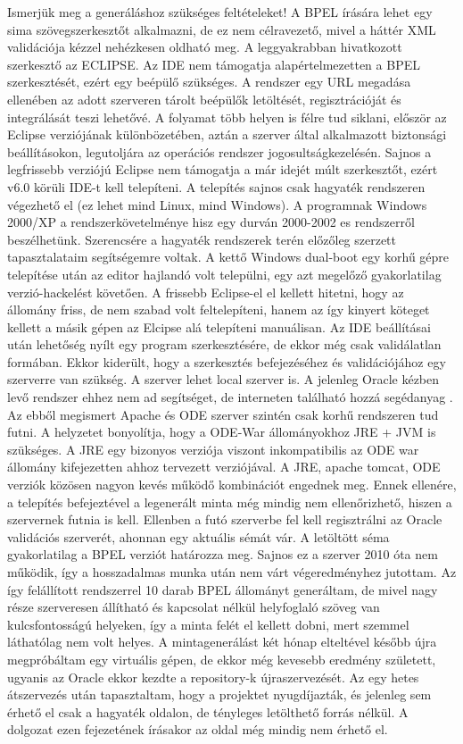 Ismerjük meg a generáláshoz szükséges feltételeket! A BPEL írására lehet egy sima szövegszerkesztőt alkalmazni, de ez nem célravezető, mivel a háttér XML validációja kézzel nehézkesen oldható meg. A leggyakrabban hivatkozott szerkesztő az ECLIPSE. Az IDE nem támogatja alapértelmezetten a BPEL szerkesztését, ezért egy beépülő szükséges. A rendszer egy URL megadása ellenében az adott szerveren tárolt beépülők letöltését, regisztrációját és integrálását teszi lehetővé. A folyamat több helyen is félre tud siklani, először az Eclipse verziójának különbözetében, aztán a szerver által alkalmazott biztonsági beállításokon, legutoljára az operációs rendszer jogosultságkezelésén. Sajnos a legfrissebb verziójú Eclipse nem támogatja a már idejét múlt szerkesztőt, ezért v6.0 körüli IDE-t kell telepíteni. A telepítés sajnos csak hagyaték rendszeren végezhető el (ez lehet mind Linux, mind Windows). A programnak Windows 2000/XP a rendszerkövetelménye hisz egy durván 2000-2002 es rendszerről beszélhetünk. Szerencsére a hagyaték rendszerek terén előzőleg szerzett tapasztalataim segítségemre voltak. A kettő Windows dual-boot egy korhű gépre telepítése után az editor hajlandó volt települni, egy azt megelőző gyakorlatilag verzió-hackelést követően. A frissebb Eclipse-el el kellett hitetni, hogy az állomány friss, de nem szabad volt feltelepíteni, hanem az így kinyert köteget kellett a másik gépen az Elcipse alá telepíteni manuálisan. Az IDE beállításai után lehetőség nyílt egy program szerkesztésére, de ekkor még csak validálatlan formában. Ekkor kiderült, hogy a szerkesztés befejezéséhez és validációjához egy szerverre van szükség. A szerver lehet local szerver is. A jelenleg Oracle kézben levő rendszer ehhez nem ad segítséget, de interneten található hozzá segédanyag \cite{helloworld}. Az ebből megismert Apache és ODE szerver szintén csak korhű rendszeren tud futni. A helyzetet bonyolítja, hogy a ODE-War állományokhoz JRE + JVM is szükséges. A JRE egy bizonyos verziója viszont inkompatibilis az ODE war állomány kifejezetten ahhoz tervezett verziójával. A JRE, apache tomcat, ODE verziók közösen nagyon kevés működő kombinációt engednek meg. Ennek ellenére, a telepítés befejeztével a legenerált minta még mindig nem ellenőrizhető, hiszen a szervernek futnia is kell. Ellenben a futó szerverbe fel kell regisztrálni az Oracle validációs szerverét, ahonnan egy aktuális sémát vár. A letöltött séma gyakorlatilag  a BPEL verziót határozza meg. Sajnos ez a szerver 2010 óta nem működik, így a hosszadalmas munka után nem várt végeredményhez jutottam. Az így felállított rendszerrel 10 darab BPEL állományt generáltam, de mivel nagy része szerveresen állítható és kapcsolat nélkül helyfoglaló szöveg van kulcsfontosságú helyeken, így a minta felét el kellett dobni, mert szemmel láthatólag nem volt helyes. A mintagenerálást két hónap elteltével később újra megpróbáltam egy virtuális gépen, de ekkor még kevesebb eredmény született, ugyanis az Oracle ekkor kezdte a repository-k újraszervezését. Az egy hetes átszervezés után tapasztaltam, hogy a projektet nyugdíjazták, és jelenleg sem érhető el csak a hagyaték oldalon, de tényleges letölthető forrás nélkül. A dolgozat ezen fejezetének írásakor az oldal még mindig nem érhető el. 

